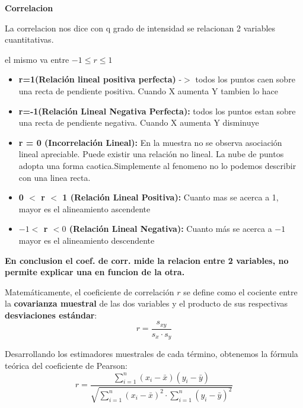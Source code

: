 \documentclass[12pt,a4paper]{article}
\begin{document}
\shorthandoff{<>}

{\fontsize{17}{21}\selectfont\bfseries Correlacion\par}

La correlacion nos dice con q grado de intensidad se relacionan 2 variables cuantitativas.

el mismo va entre $-1 \leq r \leq 1$

\begin{itemize}[leftmargin=20pt,itemsep=10pt,topsep=4pt,parsep=0pt]
  \item \textbf{r=1(Relación lineal positiva perfecta)} -$>$ todos los puntos caen sobre una recta de pendiente positiva. Cuando X aumenta Y tambien lo hace
  \item \textbf{r=-1(Relación Lineal Negativa Perfecta):} todos los puntos estan sobre una recta de pendiente negativa. Cuando X aumenta Y disminuye
  \item \textbf{r = 0 (Incorrelación Lineal):} En la muestra no se observa asociación lineal apreciable. Puede existir una relación no lineal. La nube de puntos adopta una forma caotica.Simplemente al fenomeno no lo podemos describir con una linea recta.
  \item \textbf{0 $<$ r $<$ 1 (Relación Lineal Positiva):} Cuanto mas se acerca a 1, mayor es el alineamiento ascendente
  \item \textbf{$-1 <$ r $< 0$ (Relación Lineal Negativa):} Cuanto más se acerca a $-1$ mayor es el alineamiento descendente
\end{itemize}

\textbf{En conclusion el coef. de corr. mide la relacion entre 2 variables, no permite explicar una en funcion de la otra.}

\hspace{16pt}\begin{minipage}{0.94\linewidth}
Matemáticamente, el coeficiente de correlación $r$ se define como el cociente entre la \textbf{covarianza muestral} de las dos variables y el producto de sus respectivas \textbf{desviaciones estándar}:
\[
r = \frac{s_{xy}}{s_x \cdot s_y} \tag{2}
\]

\hspace{16pt}Desarrollando los estimadores muestrales de cada término, obtenemos la fórmula teórica del coeficiente de Pearson:
\[
r = \frac{\sum_{i=1}^{n} (x_i - \bar{x})(y_i - \bar{y})}{\sqrt{\sum_{i=1}^{n}(x_i-\bar{x})^2 \cdot \sum_{i=1}^{n}(y_i-\bar{y})^2}} \tag{3}
\]
\end{minipage}
\end{document}

